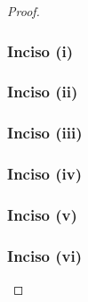 \begin{proof}
	\subsubsection{Inciso (i)} 
	
	\newpage
	
	\subsubsection{Inciso (ii)} 
	
	\newpage
		
	\subsubsection{Inciso (iii)} \label{problema1_4:M_T_es_F_T-medible}
	
	\newpage
	
	\subsubsection{Inciso (iv)} 
	
	\newpage
	
	\subsubsection{Inciso (v)}
	
	\newpage
	
	\subsubsection{Inciso (vi)}
	
\end{proof}